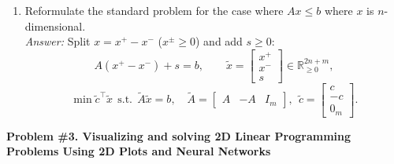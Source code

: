\documentclass[11pt]{article}
\begin{document}
\begin{enumerate}[label=\textbf{2(\alph*)}]
\begin{enumerate}[label=\roman*)]
		\item Reformulate the standard problem for the case where $Ax \leq b$ where $x$ is $n$-dimensional.\\
		\emph{Answer:} Split $x=x^+-x^-$ ($x^\pm\ge 0$) and add $s\ge 0$:
		\[
		A(x^+-x^-)+s=b,\qquad
		\tilde x=\begin{bmatrix}x^+\\x^-\\s\end{bmatrix}\in\mathbb{R}^{2n+m}_{\ge 0},
		\]
		\[
		\min \tilde c^\top \tilde x\ \ \text{s.t.}\ \ \tilde A\tilde x=b,\quad
		\tilde A=\begin{bmatrix}A&-A&I_m\end{bmatrix},\ \
		\tilde c=\begin{bmatrix}c\\-c\\0_m\end{bmatrix}.
		\]
	\end{enumerate}
\end{enumerate}

\newpage
	
\textbf{Problem \#3. Visualizing and solving 2D Linear Programming Problems Using 2D Plots and Neural Networks}
\end{document}
